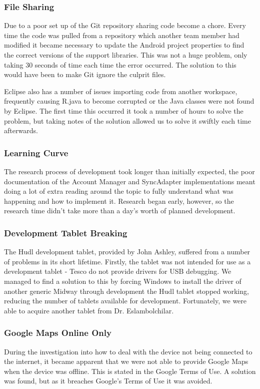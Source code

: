 \documentclass[11pt,a4paper]{report}
\begin{document}
\subsubsection{File Sharing}
Due to a poor set up of the Git repository sharing code become a chore. Every time the code was pulled from a repository which another team member had modified it became necessary to update the Android project properties to find the correct versions of the support libraries. This was not a huge problem, only taking 30 seconds of time each time the error occurred. The solution to this would have been to make Git ignore the culprit files.

Eclipse also has a number of issues importing code from another workspace, frequently causing R.java to become corrupted or the Java classes were not found by Eclipse. The first time this occurred it took a number of hours to solve the problem, but taking notes of the solution allowed us to solve it swiftly each time afterwards.

\subsubsection{Learning Curve}
The research process of development took longer than initially expected, the poor documentation of the Account Manager and SyncAdapter implementations meant doing a lot of extra reading around the topic to fully understand what was happening and how to implement it. Research began early, however, so the research time didn't take more than a day's worth of planned development.

\subsubsection{Development Tablet Breaking}
The Hudl development tablet, provided by John Ashley, suffered from a number of problems in its short lifetime. Firstly, the tablet was not intended for use as a development tablet - Tesco do not provide drivers for USB debugging. We managed to find a solution to this by forcing Windows to install the driver of another generic 
Midway through development the Hudl tablet stopped working, reducing the number of tablets available for development. Fortunately, we were able to acquire another tablet from Dr. Eslambolchilar.

\subsubsection{Google Maps Online Only}
During the investigation into how to deal with the device not being connected to the internet, it became apparent that we were not able to provide Google Maps when the device was offline. This is stated in the Google Terms of Use. A solution was found, but as it breaches Google's Terms of Use it was avoided.
\end{document}
